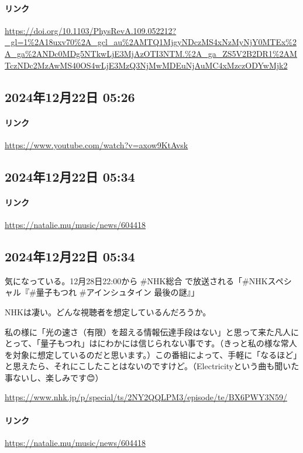 \paragraph{リンク}
\url{https://doi.org/10.1103/PhysRevA.109.052212?_gl=1%2A18uxv70%2A_gcl_au%2AMTQ1MjgyNDczMS4xNzMyNjY0MTEx%2A_ga%2ANDc0MDg5NTkwLjE3MjAzOTI3NTM.%2A_ga_ZS5V2B2DR1%2AMTczNDc2MzAwMS40OS4wLjE3MzQ3NjMwMDEuNjAuMC4xMzczODYwMjk2}

\subsection*{2024年12月22日 05:26}

\paragraph{リンク}
\url{https://www.youtube.com/watch?v=axow9KtAvsk}

\subsection*{2024年12月22日 05:34}

\paragraph{リンク}
\url{https://natalie.mu/music/news/604418}

\subsection*{2024年12月22日 05:34}

気になっている。12月28日22:00から \#NHK総合 で放送される「\#NHKスペシャル『\#量子もつれ \#アインシュタイン 最後の謎』」

NHKは凄い。どんな視聴者を想定しているんだろうか。

私の様に「光の速さ（有限）を超える情報伝達手段はない」と思って来た凡人にとって、「量子もつれ」はにわかには信じられない事です。（きっと私の様な常人を対象に想定しているのだと思います。）この番組によって、手軽に「なるほど」と思えたら、それにこしたことはないのですけど。（Electricityという曲も聞いた事ないし、楽しみです😊）

\url{https://www.nhk.jp/p/special/ts/2NY2QQLPM3/episode/te/BX6PWY3N59/}

\paragraph{リンク}
\url{https://natalie.mu/music/news/604418}

